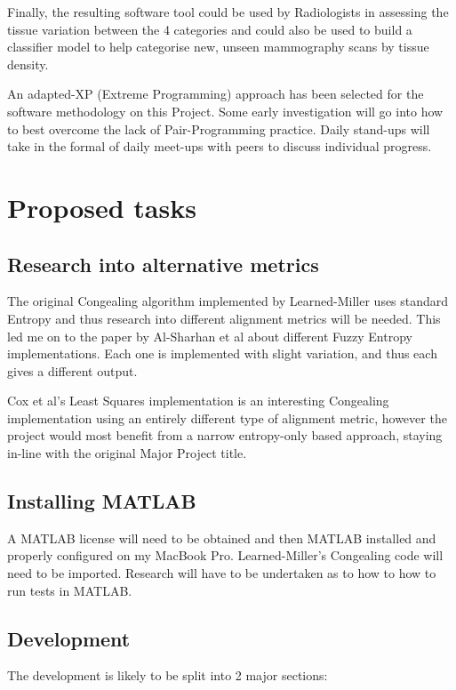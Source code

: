 \documentclass[11pt,fleqn,twoside]{article}
\begin{document}
Finally, the resulting software tool could be used by Radiologists in assessing the tissue variation between the 4 categories and could also be used to build a classifier model to help categorise new, unseen mammography scans by tissue density.

An adapted-XP (Extreme Programming) approach has been selected for the software methodology on this Project. Some early investigation will go into how to best overcome the lack of Pair-Programming practice. Daily stand-ups will take in the formal of daily meet-ups with peers to discuss individual progress. \par

\section{Proposed tasks}

\subsection{Research into alternative metrics}
\label{ssec:alt-met}
The original Congealing algorithm implemented by Learned-Miller uses standard Entropy and thus research into different alignment metrics will be needed. This led me on to the paper by Al-Sharhan et al \cite{fuzzy-entropy} about different Fuzzy Entropy implementations. Each one is implemented with slight variation, and thus each gives a different output.

Cox et al's Least Squares implementation \cite{least-squares-congealing} is an interesting Congealing implementation using an entirely different type of alignment metric, however the project would most benefit from a narrow entropy-only based approach, staying in-line with the original Major Project title.

\subsection{Installing MATLAB}
A MATLAB license will need to be obtained and then MATLAB installed and properly configured on my MacBook Pro. Learned-Miller's Congealing code will need to be imported. Research will have to be undertaken as to how to how to run tests in MATLAB.

\subsection{Development}
The development is likely to be split into 2 major sections:
\end{document}
